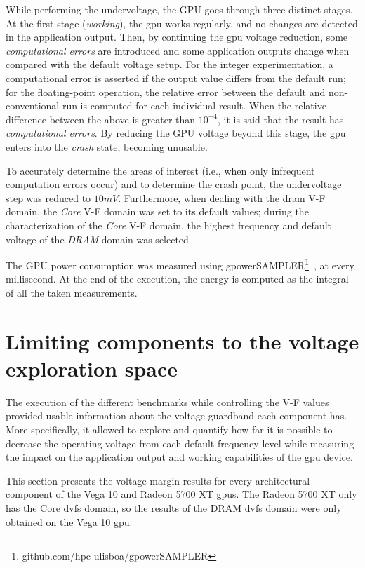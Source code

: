 While performing the undervoltage, the GPU goes through three distinct stages. At the first stage (\textit{working}), the \acrshort{gpu} works regularly, and no changes are detected in the application output. Then, by continuing the \acrshort{gpu} voltage reduction, some \textit{computational errors} are introduced and some application outputs change when compared with the default voltage setup. For the integer experimentation, a computational error is asserted if the output value differs from the default run; for the floating-point operation, the relative error between the default and non-conventional run is computed for each individual result. When the relative difference between the above is greater than $10^{-4}$, it is said that the result has \textit{computational errors}.
By reducing the GPU voltage beyond this stage, the \acrshort{gpu} enters into the \textit{crash} state, becoming unusable.

To accurately determine the areas of interest (i.e., when only infrequent computation errors occur) and to determine the crash point, the undervoltage step was reduced to $10mV$. Furthermore, when dealing with the \acrshort{dram} V-F domain, the \textit{Core} V-F domain was set to its default values; during the characterization of the \textit{Core} V-F domain, the highest frequency and default voltage of the \textit{DRAM} domain  was selected. 

The GPU power consumption was measured using gpowerSAMPLER\footnote{github.com/hpc-ulisboa/gpowerSAMPLER}~\cite{guerreiro_gpgpu_2018}, at every millisecond. At the end of the execution, the energy is computed as the integral of all the taken measurements. 

\section{Limiting components to the voltage exploration space}
\label{sec:limiting_components}

The execution of the different benchmarks while controlling the V-F values provided usable information about the voltage guardband each component has. More specifically, it allowed to explore and quantify how far it is possible to decrease the operating voltage from each default frequency level while measuring the impact on the application output and working capabilities of the \acrshort{gpu} device. 


This section presents the voltage margin results for every architectural component of the Vega 10 and Radeon 5700 XT \acrshort{gpu}s. The Radeon 5700 XT only has the Core \acrshort{dvfs} domain, so the results of the DRAM \acrshort{dvfs} domain were only obtained on the Vega 10 \acrshort{gpu}.


